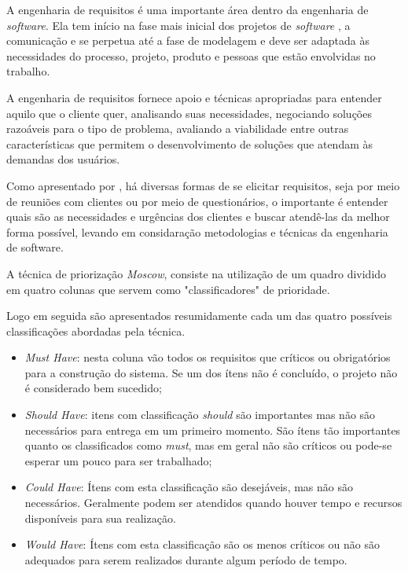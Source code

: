A engenharia de requisitos é uma importante área dentro da engenharia de \textit{software}. Ela tem início na fase mais
inicial dos projetos de \textit{software} , a comunicação e se perpetua até a fase de modelagem e deve ser adaptada às 
necessidades do processo, projeto, produto e pessoas que estão envolvidas no trabalho.

A engenharia de requisitos fornece apoio e técnicas apropriadas para entender aquilo que o cliente quer, 
analisando suas necessidades, negociando soluções razoáveis para o tipo de problema, avaliando a viabilidade
entre outras características que permitem o desenvolvimento de soluções que atendam às demandas dos usuários.


Como apresentado por , há diversas formas de se elicitar requisitos, seja por meio de reuniões
com clientes ou por meio de questionários, o importante é entender quais são as necessidades e urgências dos clientes
e buscar atendê-las da melhor forma possível, levando em considaração metodologias e técnicas da engenharia de software.

A técnica de priorização \textit{Moscow}, consiste na utilização de um quadro dividido em quatro colunas que servem como "classificadores"
de prioridade.\cite{moscow}

Logo em seguida são apresentados resumidamente cada um das quatro possíveis classificações abordadas pela técnica.
\begin{itemize}
	\item  \textit{Must Have}: nesta coluna vão todos os requisitos que críticos ou obrigatórios para a construção do sistema. Se um dos ítens
não é concluído, o projeto não é considerado bem sucedido;
	\item  \textit{Should Have}: itens com classificação \textit{should} são importantes mas não são necessários para entrega em um primeiro 
momento. São ítens tão importantes quanto os classificados como \textit{must}, mas em geral não são críticos ou pode-se esperar um pouco para ser
trabalhado;
	\item \textit{Could Have}: Ítens com esta classificação são desejáveis, mas não são necessários. Geralmente podem ser atendidos quando 
houver tempo e recursos disponíveis para sua realização.
	\item \textit{Would Have}: Ítens com esta classificação são os menos críticos ou não são adequados para serem realizados durante algum
período de tempo.
\end{itemize}

